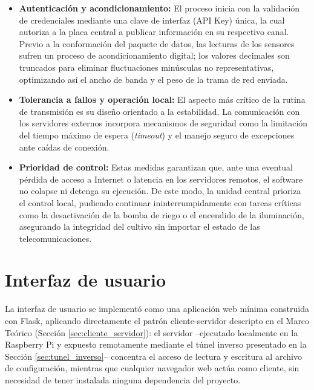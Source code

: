 \begin{itemize}
    \item \textbf{Autenticación y acondicionamiento:} El proceso inicia con la validación de credenciales mediante una clave de interfaz (API Key) única, la cual autoriza a la placa central a publicar información en su respectivo canal. Previo a la conformación del paquete de datos, las lecturas de los sensores sufren un proceso de acondicionamiento digital; los valores decimales son truncados para eliminar fluctuaciones minúsculas no representativas, optimizando así el ancho de banda y el peso de la trama de red enviada.
    \item \textbf{Tolerancia a fallos y operación local:} El aspecto más crítico de la rutina de transmisión es su diseño orientado a la estabilidad. La comunicación con los servidores externos incorpora mecanismos de seguridad como la limitación del tiempo máximo de espera (\textit{timeout}) y el manejo seguro de excepciones ante caídas de conexión.
    \item \textbf{Prioridad de control:} Estas medidas garantizan que, ante una eventual pérdida de acceso a Internet o latencia en los servidores remotos, el software no colapse ni detenga su ejecución. De este modo, la unidad central prioriza el control local, pudiendo continuar ininterrumpidamente con tareas críticas como la desactivación de la bomba de riego o el encendido de la iluminación, asegurando la integridad del cultivo sin importar el estado de las telecomunicaciones.
\end{itemize}

\section{Interfaz de usuario}
\label{sec:interfaz_usuario}

La interfaz de usuario se implementó como una aplicación web mínima construida con Flask, aplicando directamente el patrón cliente-servidor descripto en el Marco Teórico (Sección \ref{sec:cliente_servidor}): el servidor --ejecutado localmente en la Raspberry Pi y expuesto remotamente mediante el túnel inverso presentado en la Sección \ref{sec:tunel_inverso}-- concentra el acceso de lectura y escritura al archivo de configuración, mientras que cualquier navegador web actúa como cliente, sin necesidad de tener instalada ninguna dependencia del proyecto.

